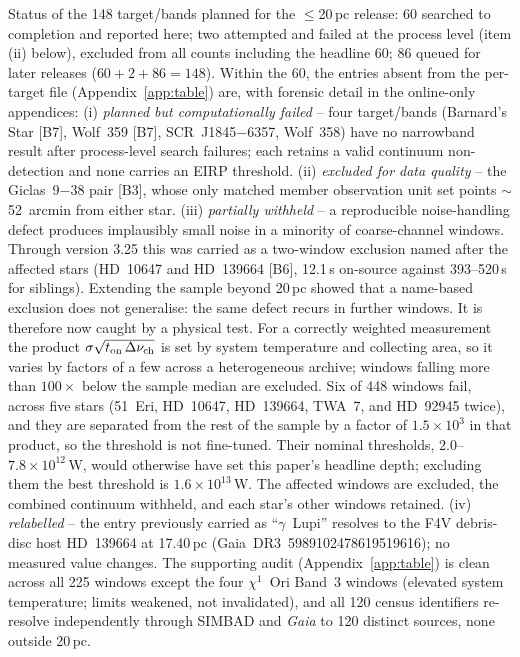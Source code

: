 \documentclass{openjournal}
\begin{document}
Status of the 148 target/bands planned for the $\le$20\,pc release: 60
searched to completion and reported here; two attempted and failed at
the process level (item (ii) below), excluded from all counts
including the headline 60; 86 queued for later releases
($60+2+86=148$). Within the 60, the entries absent from
the per-target file (Appendix~\ref{app:table}) are, with forensic detail in the online-only
appendices:
(i) \emph{planned but computationally failed} -- four target/bands
(Barnard's Star [B7], Wolf~359 [B7], SCR~J1845$-$6357, Wolf~358) have
no narrowband result after process-level search failures; each retains
a valid continuum non-detection and none carries an EIRP threshold.
(ii) \emph{excluded for data quality} -- the Giclas~9$-$38 pair [B3],
whose only matched member observation unit set points
$\sim$52~arcmin from either star.
(iii) \emph{partially withheld} -- a reproducible noise-handling defect
produces implausibly small noise in a minority of coarse-channel
windows. Through version 3.25 this was carried as a two-window
exclusion named after the affected stars (HD~10647 and HD~139664 [B6],
12.1\,s on-source against 393--520\,s for siblings). Extending the
sample beyond 20\,pc showed that a name-based exclusion does not
generalise: the same defect recurs in further windows. It is therefore
now caught by a physical test. For a correctly weighted measurement the
product $\sigma\sqrt{t_{\rm on}\,\Delta\nu_{\rm ch}}$ is set by system
temperature and collecting area, so it varies by factors of a few
across a heterogeneous archive; windows falling more than $100\times$
below the sample median are excluded. Six of 448 windows fail, across
five stars (51~Eri, HD~10647, HD~139664, TWA~7, and HD~92945 twice),
and they are separated from the rest of the sample by a factor of
$1.5\times10^{3}$ in that product, so the threshold is not fine-tuned.
Their nominal thresholds, $2.0$--$7.8\times10^{12}$\,W, would otherwise
have set this paper's headline depth; excluding them the best threshold
is $1.6\times10^{13}$\,W. The affected windows are excluded, the
combined continuum withheld, and each star's other windows retained.
(iv) \emph{relabelled} -- the entry previously carried as
``$\gamma$~Lupi'' resolves to the F4V debris-disc host HD~139664 at
17.40\,pc (Gaia~DR3~5989102478619519616); no measured value changes.
The supporting audit (Appendix~\ref{app:table}) is clean across all
225 windows except the four $\chi^{1}$~Ori Band~3 windows (elevated
system temperature; limits weakened, not invalidated), and all 120
census identifiers re-resolve independently through SIMBAD and
\emph{Gaia} to 120 distinct sources, none outside 20\,pc.
\end{document}
